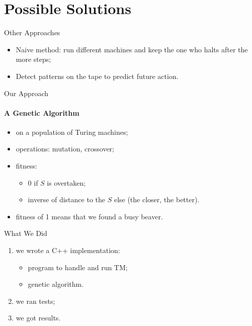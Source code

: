 \documentclass{beamer}
\begin{document}
\section{Possible Solutions}

\begin{frame}{Other Approaches}

  \begin{itemize}
  \item Naive method: run different machines and keep the one who halts after the more steps; %
  \item Detect patterns on the tape to predict future action.
  \end{itemize}

\end{frame}

\begin{frame}{Our Approach}
  \framesubtitle{A Genetic Algorithm}

  \begin{itemize}
  \item on a population of Turing machines;
  \item operations: mutation, crossover;
  \item fitness:
    \begin{itemize}
    \item 0 if $S$ is overtaken;
    \item inverse of distance to the $S$ else (the closer, the better).
    \end{itemize}
  \item fitness of 1 means that we found a busy beaver.
  \end{itemize}

\end{frame}

\begin{frame}{What We Did}

  \begin{enumerate}
  \item we wrote a C++ implementation:
    \begin{itemize}
    \item program to handle and run TM;
    \item genetic algorithm.
    \end{itemize}
  \item we ran tests;
  \item we got results.
  \end{enumerate}
\end{frame}
\end{document}
